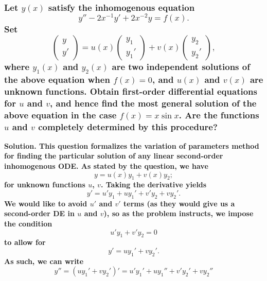 \documentclass{article}
\begin{document}
\subsubsection*{Let $y(x)$ satisfy the inhomogenous equation
\begin{equation*}
    y''-2x^{-1}y'+2x^{-2}y=f(x).
\end{equation*}
Set
\begin{equation*}
    \begin{pmatrix}
        y \\ y'
    \end{pmatrix}
    = 
    u(x)
    \begin{pmatrix}
        y_1 \\ y_1'
    \end{pmatrix}
    +
    v(x)
    \begin{pmatrix}
        y_2 \\ y_2'
    \end{pmatrix},
\end{equation*}
where $y_1(x)$ and $y_2(x)$ are two independent solutions of the above equation when $f(x) = 0$, and $u(x)$ and $v(x)$ are unknown functions. Obtain first-order differential equations for $u$ and $v$, and hence find the most general solution of the above equation in the case $f(x) = x \sin x$. Are the functions $u$ and $v$ completely determined by this procedure?   
}
\bf Solution. \normalfont This question formalizes the variation of parameters method for finding the particular solution of any linear second-order inhomogenous ODE. As stated by the question, we have
\begin{equation*}
        y = u(x)y_1 + v(x)y_2;
\end{equation*}
for unknown functions $u$, $v$. Taking the derivative yields
\begin{equation*}
    y' = u'y_1 + uy_1' + v'y_2 + vy_2'.
\end{equation*}
We would like to avoid $u'$ and $v'$ terms (as they would give us a second-order DE in $u$ and $v$), so as the problem instructs, we impose the condition
\begin{equation*}
    u'y_1 + v'y_2 = 0
\end{equation*}
to allow for
\begin{equation*}
    y' = uy_1'+vy_2'.
\end{equation*}
As such, we can write 
\begin{equation*}
    y'' = (uy_1'+vy_2')' = u'y_1' + uy_1'' + v'y_2' + vy_2''
\end{equation*}
\end{document}
